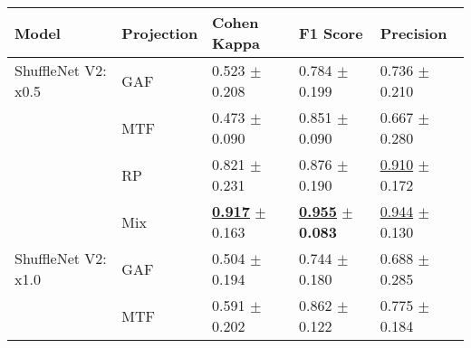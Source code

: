 
\begin{tabular}[t]{lllll}
\toprule
Model & Projection & Cohen Kappa & F1 Score & Precision \\
\midrule
ShuffleNet V2: x0.5 & GAF & \textcolor[rgb]{0.8873720137,0.1126279863,0}{0.523} $\pm$ \textcolor[rgb]{0.8343759381,0.1656240619,0}{0.208} & \textcolor[rgb]{0.6687402799,0.3312597201,0}{0.784} $\pm$ \textcolor[rgb]{0.7892330506,0.2107669494,0}{0.199} & \textcolor[rgb]{0.6673189824,0.3326810176,0}{0.736} $\pm$ \textcolor[rgb]{0.3897371717,0.5000000000,0}{0.210} \\
 & MTF & \textcolor[rgb]{1.0000000000,0.0000000000,0}{0.473} $\pm$ \textcolor[rgb]{0.3631919561,0.5000000000,0}{0.090} & \textcolor[rgb]{0.4059097978,0.5000000000,0}{0.851} $\pm$ \textcolor[rgb]{0.0459000684,0.5000000000,0}{0.090} & \textcolor[rgb]{0.8825831703,0.1174168297,0}{0.667} $\pm$ \textcolor[rgb]{0.6766436317,0.3233563683,0}{0.280} \\
 & RP & \textcolor[rgb]{0.2158703072,0.5000000000,0}{0.821} $\pm$ \textcolor[rgb]{0.9277733337,0.0722266663,0}{0.231} & \textcolor[rgb]{0.3079315708,0.5000000000,0}{0.876} $\pm$ \textcolor[rgb]{0.7294240912,0.2705759088,0}{0.190} & \underline{\textcolor[rgb]{0.1291585127,0.5000000000,0}{0.910}} $\pm$ \textcolor[rgb]{0.2351015167,0.5000000000,0}{0.172} \\
 & Mix & \underline{\textbf{\textcolor[rgb]{0.0000000000,0.5000000000,0}{0.917}}} $\pm$ \textcolor[rgb]{0.6538202475,0.3461797525,0}{0.163} & \underline{\textbf{\textcolor[rgb]{0.0000000000,0.5000000000,0}{0.955}}} $\pm$ \textbf{\textcolor[rgb]{0.0000000000,0.5000000000,0}{0.083}} & \underline{\textcolor[rgb]{0.0215264188,0.5000000000,0}{0.944}} $\pm$ \textcolor[rgb]{0.0609939296,0.5000000000,0}{0.130} \\
ShuffleNet V2: x1.0 & GAF & \textcolor[rgb]{0.9291808874,0.0708191126,0}{0.504} $\pm$ \textcolor[rgb]{0.7773511492,0.2226488508,0}{0.194} & \textcolor[rgb]{0.8253923371,0.1746076629,0}{0.744} $\pm$ \textcolor[rgb]{0.6641345574,0.3358654426,0}{0.180} & \textcolor[rgb]{0.8180039139,0.1819960861,0}{0.688} $\pm$ \textcolor[rgb]{0.6973487950,0.3026512050,0}{0.285} \\
 & MTF & \textcolor[rgb]{0.7337883959,0.2662116041,0}{0.591} $\pm$ \textcolor[rgb]{0.8121219026,0.1878780974,0}{0.202} & \textcolor[rgb]{0.3639191291,0.5000000000,0}{0.862} $\pm$ \textcolor[rgb]{0.2646008883,0.5000000000,0}{0.122} & \textcolor[rgb]{0.5467710372,0.4532289628,0}{0.775} $\pm$ \textcolor[rgb]{0.2859299411,0.5000000000,0}{0.184} \\

\end{tabular}
